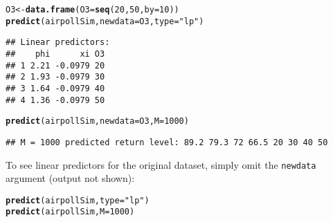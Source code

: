 \documentclass[10pt]{article}\usepackage[]{graphicx}\usepackage[]{color}
\makeatletter
\newcommand{\hlnum}[1]{\textcolor[rgb]{0.686,0.059,0.569}{#1}}%
\newcommand{\hlstr}[1]{\textcolor[rgb]{0.192,0.494,0.8}{#1}}%
\newcommand{\hlstd}[1]{\textcolor[rgb]{0.345,0.345,0.345}{#1}}%
\newcommand{\hlkwb}[1]{\textcolor[rgb]{0.69,0.353,0.396}{#1}}%
\newcommand{\hlkwc}[1]{\textcolor[rgb]{0.333,0.667,0.333}{#1}}%
\newcommand{\hlkwd}[1]{\textcolor[rgb]{0.737,0.353,0.396}{\textbf{#1}}}%
\newenvironment{kframe}{%
 \def\at@end@of@kframe{}%
 \ifinner\ifhmode%
  \def\at@end@of@kframe{\end{minipage}}%
  \begin{minipage}{\columnwidth}%
 \fi\fi%
 \def\FrameCommand##1{\hskip\@totalleftmargin \hskip-\fboxsep
 \colorbox{shadecolor}{##1}\hskip-\fboxsep
     \hskip-\linewidth \hskip-\@totalleftmargin \hskip\columnwidth}%
 \MakeFramed {\advance\hsize-\width
   \@totalleftmargin\z@ \linewidth\hsize
   \@setminipage}}%
 {\par\unskip\endMakeFramed%
 \at@end@of@kframe}
\newenvironment{knitrout}{}{} %
\makeatother
\begin{document}
\begin{knitrout}
\color{fgcolor}\begin{kframe}
\begin{alltt}
\hlstd{O3} \hlkwb{<-} \hlkwd{data.frame}\hlstd{(}\hlkwc{O3}\hlstd{=}\hlkwd{seq}\hlstd{(}\hlnum{20}\hlstd{,}\hlnum{50}\hlstd{,}\hlkwc{by}\hlstd{=}\hlnum{10}\hlstd{))}
\hlkwd{predict}\hlstd{(airpollSim,}\hlkwc{newdata}\hlstd{=O3,}\hlkwc{type}\hlstd{=}\hlstr{"lp"}\hlstd{)}
\end{alltt}
\begin{verbatim}
## Linear predictors:
##    phi      xi O3
## 1 2.21 -0.0979 20
## 2 1.93 -0.0979 30
## 3 1.64 -0.0979 40
## 4 1.36 -0.0979 50
\end{verbatim}
\begin{alltt}
\hlkwd{predict}\hlstd{(airpollSim,}\hlkwc{newdata}\hlstd{=O3,}\hlkwc{M}\hlstd{=}\hlnum{1000}\hlstd{)}
\end{alltt}
\begin{verbatim}
## M = 1000 predicted return level: 89.2 79.3 72 66.5 20 30 40 50
\end{verbatim}
\end{kframe}
\end{knitrout}
To see linear predictors for the original dataset, simply omit the {\tt newdata} argument (output not shown):
\begin{knitrout}
\color{fgcolor}\begin{kframe}
\begin{alltt}
\hlkwd{predict}\hlstd{(airpollSim,}\hlkwc{type}\hlstd{=}\hlstr{"lp"}\hlstd{)}
\hlkwd{predict}\hlstd{(airpollSim,}\hlkwc{M}\hlstd{=}\hlnum{1000}\hlstd{)}
\end{alltt}
\end{kframe}
\end{knitrout}
\end{document}

